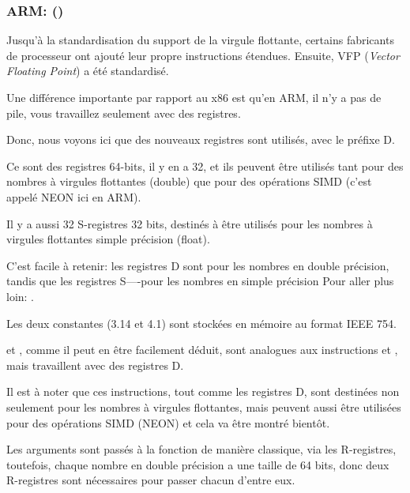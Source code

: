 \subsubsection{ARM: \OptimizingXcodeIV (\ARMMode)}

Jusqu'à la standardisation du support de la virgule flottante, certains fabricants
de processeur ont ajouté leur propre instructions étendues.
Ensuite, VFP (\emph{Vector Floating Point}) a été standardisé.

Une différence importante par rapport au x86 est qu'en ARM, il n'y a pas de pile,
vous travaillez seulement avec des registres.




Donc, nous voyons ici que des nouveaux registres sont utilisés, avec le préfixe D.

Ce sont des registres 64-bits, il y en a 32, et ils peuvent être utilisés tant pour
des nombres à virgules flottantes (double) que pour des opérations SIMD (c'est appelé
NEON ici en ARM).

Il y a aussi 32 S-registres 32 bits, destinés à être utilisés pour les nombres à
virgules flottantes simple précision (float).

C'est facile à retenir: les registres D sont pour les nombres en double précision,
tandis que les registres S----pour les nombres en simple précision
Pour aller plus loin: .

Les deux constantes (3.14 et 4.1) sont stockées en mémoire au format IEEE 754.

 et , comme il peut en être facilement déduit, sont analogues
aux instructions  et \MOV, mais travaillent avec des registres D.

Il est à noter que ces instructions, tout comme les registres D, sont destinées non
seulement pour les nombres à virgules flottantes, mais peuvent aussi être utilisées
pour des opérations SIMD (NEON) et cela va être montré bientôt.

Les arguments sont passés à la fonction de manière classique, via les R-registres,
toutefois, chaque nombre en double précision a une taille de 64 bits, donc deux
R-registres sont nécessaires pour passer chacun d'entre eux.

